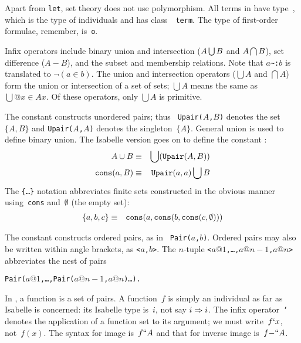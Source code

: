 Apart from {\tt let}, set theory does not use polymorphism.  All terms in
{\ZF} have type~, which is the type of individuals and has class~{\tt
  term}.  The type of first-order formulae, remember, is~{\tt o}.

Infix operators include binary union and intersection ($A\bigcup B$ and
$A\bigcap B$), set difference ($A-B$), and the subset and membership
relations.  Note that $a$\verb|~:|$b$ is translated to $\neg(a\in b)$.  The
union and intersection operators ($\bigcup A$ and $\bigcap A$) form the
union or intersection of a set of sets; $\bigcup A$ means the same as
$\bigcup@{x\in A}x$.  Of these operators, only $\bigcup A$ is primitive.

The constant  constructs unordered pairs; thus {\tt
  Upair($A$,$B$)} denotes the set~$\{A,B\}$ and {\tt Upair($A$,$A$)}
denotes the singleton~$\{A\}$.  General union is used to define binary
union.  The Isabelle version goes on to define the constant
:
\begin{eqnarray*}
   A\cup B              & \equiv &       \bigcup({\tt Upair}(A,B)) \\
   {\tt cons}(a,B)      & \equiv &        {\tt Upair}(a,a) \bigcup B
\end{eqnarray*}
The {\tt\{\ldots\}} notation abbreviates finite sets constructed in the
obvious manner using~{\tt cons} and~$\emptyset$ (the empty set):
\begin{eqnarray*}
 \{a,b,c\} & \equiv & {\tt cons}(a,{\tt cons}(b,{\tt cons}(c,\emptyset)))
\end{eqnarray*}

The constant  constructs ordered pairs, as in {\tt
Pair($a$,$b$)}.  Ordered pairs may also be written within angle brackets,
as {\tt<$a$,$b$>}.  The $n$-tuple {\tt<$a@1$,\ldots,$a@{n-1}$,$a@n$>}
abbreviates the nest of pairs\par\nobreak
\centerline{\tt Pair($a@1$,\ldots,Pair($a@{n-1}$,$a@n$)\ldots).}

In {\ZF}, a function is a set of pairs.  A {\ZF} function~$f$ is simply an
individual as far as Isabelle is concerned: its Isabelle type is~$i$, not
say $i\Rightarrow i$.  The infix operator~{\tt`} denotes the application of a
function set to its argument; we must write~$f{\tt`}x$, not~$f(x)$.  The
syntax for image is~$f{\tt``}A$ and that for inverse image is~$f{\tt-``}A$.


